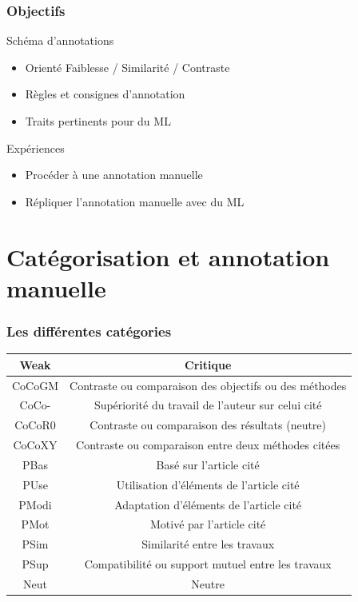 \documentclass[10pt]{beamer}
\begin{document}
\begin{frame}
  \frametitle{Objectifs}
  
  \begin{block}{Schéma d'annotations}
	  \begin{itemize}
		\item Orienté Faiblesse / Similarité / Contraste
		\item Règles et consignes d'annotation
		\item Traits pertinents pour du ML
	  \end{itemize}
  \end{block}
  
  \begin{block}{Expériences}
	  \begin{itemize}
	  	\item Procéder à une annotation manuelle
		\item Répliquer l'annotation manuelle avec du ML
	  \end{itemize}
  \end{block}
\end{frame}

\section{Catégorisation et annotation manuelle}
\label{sec:catandmanual}


\begin{frame}
  \frametitle{Les différentes catégories}

	\begin{tabular}{| c | c |}
		\hline
		Weak & Critique \\
		\hline
		CoCoGM & Contraste ou comparaison des objectifs ou des méthodes \\
		CoCo- &  Supériorité du travail de l'auteur sur celui cité \\
		CoCoR0 & Contraste ou comparaison des résultats (neutre) \\
		CoCoXY & Contraste ou comparaison entre deux méthodes citées \\
		\hline
		PBas & Basé sur l'article cité \\
		PUse & Utilisation d'éléments de l'article cité \\
		PModi & Adaptation d'éléments de l'article cité \\
		PMot & Motivé par l'article cité \\
		PSim & Similarité entre les travaux \\
		PSup & Compatibilité ou support mutuel entre les travaux \\
		\hline
		Neut & Neutre \\
		\hline
	\end{tabular}
\end{frame}
\end{document}
